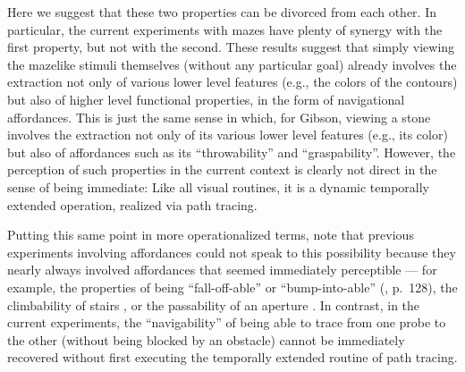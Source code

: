 Here we suggest that these two properties can be divorced from each other. In particular, the current experiments with mazes have plenty of synergy with the first property, but not with the second. These results suggest that simply viewing the mazelike stimuli themselves (without any particular goal) already involves the extraction not only of various lower level features (e.g., the colors of the contours) but also of higher level functional properties, in the form of navigational affordances. This is just the same sense in which, for Gibson, viewing a stone involves the extraction not only of its various lower level features (e.g., its color) but also of affordances such as its “throwability” and “graspability”. However, the perception of such properties in the current context is clearly not direct in the sense of being immediate: Like all visual routines, it is a dynamic temporally extended operation, realized via path tracing.\footnotemark


Putting this same point in more operationalized terms, note that previous experiments involving affordances could not speak to this possibility because they nearly always involved affordances that seemed immediately perceptible --- for example, the properties of being “fall-off-able” or “bump-into-able” (\cite{gibson_ecological_1979}, p.~128), the climbability of stairs \parencite{warren_perceiving_1984}, or the passability of an aperture \parencite{warren_visual_1987}. In contrast, in the current experiments, the “navigability” of being able to trace from one probe to the other (without being blocked by an obstacle) cannot be immediately recovered without first executing the temporally extended routine of path tracing.

